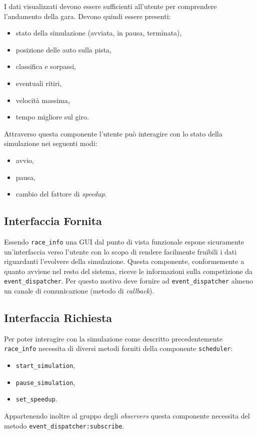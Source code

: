 \documentclass[11pt,a4paper]{report}
\newcommand{\fun}[1]{\texttt{#1}}
\begin{document}
I dati visualizzati devono essere sufficienti all'utente per comprendere l'andamento della gara. Devono quindi essere presenti:
\begin{itemize}
\item stato della simulazione (avviata, in pausa, terminata),
\item posizione delle auto sulla pista,
\item classifica e sorpassi,
\item eventuali ritiri,
\item velocità massima,
\item tempo migliore sul giro.
\end{itemize}
Attraverso questa componente l'utente può interagire con lo stato della simulazione nei seguenti modi:
\begin{itemize}
\item avvio,
\item pausa,
\item cambio del fattore di \textit{speedup}.
\end{itemize}

\subsection*{Interfaccia Fornita}
Essendo \texttt{race\_info} una GUI dal punto di vista funzionale espone sicuramente un'interfaccia verso l'utente con lo scopo di rendere facilmente fruibili i dati riguardanti l'evolvere della simulazione.
Questa componente, conformemente a quanto avviene nel resto del sistema, riceve le informazioni sulla competizione da \texttt{event\_dispatcher}. Per questo motivo deve fornire ad \texttt{event\_dispatcher} almeno un canale di comunicazione (metodo di \textit{callback}).

\subsection*{Interfaccia Richiesta}
Per poter interagire con la simulazione come descritto precedentemente \texttt{race\_info} necessita di diversi metodi forniti della componente \texttt{scheduler}:
\begin{itemize}
\item \fun{start\_simulation},
\item \fun{pause\_simulation},
\item \fun{set\_speedup}.
\end{itemize}
Appartenendo inoltre al gruppo degli \textit{observers} questa componente necessita del metodo \fun{event\_dispatcher:subscribe}.
\end{document}
